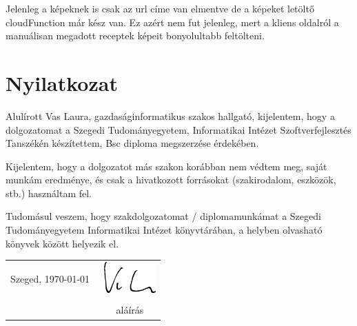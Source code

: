 \documentclass[12pt]{report}
\theoremstyle{definition}
\begin{document}
Jelenleg a képeknek is csak az url címe van elmentve de a képeket letöltő \gls{cloudFunction} már kész van. Ez azért nem fut jelenleg, mert a kliens oldalról a manuálisan megadott receptek képeit bonyolultabb feltölteni. 


\chapter*{Nyilatkozat}




\noindent
Alulírott %
Vas Laura, gazdaságinformatikus szakos hallgató, kijelentem, hogy a dolgozatomat a Szegedi Tudományegyetem, Informatikai Intézet %
Szoftverfejlesztés Tanszékén készítettem, %
Bsc diploma megszerzése érdekében.

Kijelentem, hogy a dolgozatot más szakon korábban nem védtem meg, saját munkám eredménye, és csak a hivatkozott forrásokat (szakirodalom, eszközök, stb.) használtam fel.

Tudomásul veszem, hogy szakdolgozatomat / diplomamunkámat a Szegedi Tudományegyetem Informatikai Intézet könyvtárában, a helyben olvasható könyvek között helyezik el. 

\vspace*{2cm}

\begin{tabular}{lc}
	Szeged, \today\
	\hspace{2cm} & \includegraphics[height=1.2cm]{pictures/signiture.eps} \\ 
				 & \makebox[6cm]{\dotfill} \\
	             & aláírás                 \\
\end{tabular}
\end{document}
